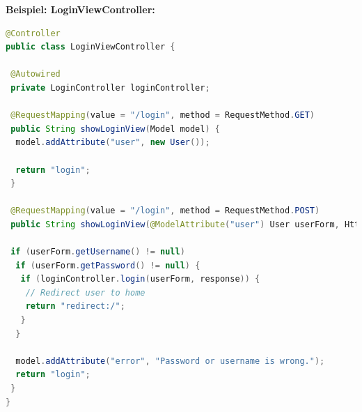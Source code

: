 \documentclass[
    a4paper
]{scrreprt}
\begin{document}
	\textbf{Beispiel: LoginViewController:}
	\begin{lstlisting}[language=java]
@Controller
public class LoginViewController {

 @Autowired
 private LoginController loginController;

 @RequestMapping(value = "/login", method = RequestMethod.GET)
 public String showLoginView(Model model) {
  model.addAttribute("user", new User());

  return "login";
 }

 @RequestMapping(value = "/login", method = RequestMethod.POST)
 public String showLoginView(@ModelAttribute("user") User userForm, HttpServletResponse response, Model model) {

 if (userForm.getUsername() != null)
  if (userForm.getPassword() != null) {
   if (loginController.login(userForm, response)) {
    // Redirect user to home
    return "redirect:/";
   }
  }

  model.addAttribute("error", "Password or username is wrong.");
  return "login";
 }
}
	\end{lstlisting}

\end{document}

